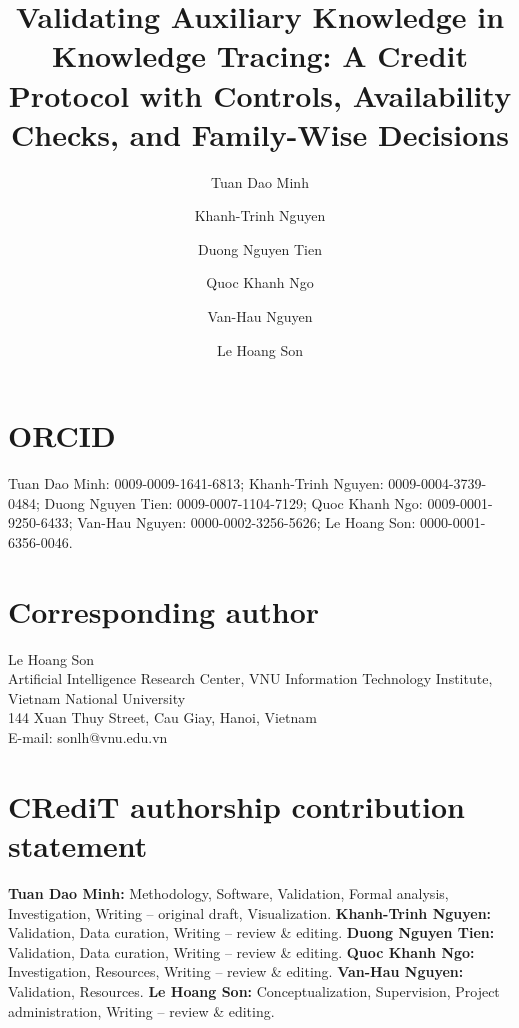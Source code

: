 \documentclass[preprint,12pt]{elsarticle}
\begin{document}
\begin{frontmatter}
\title{Validating Auxiliary Knowledge in Knowledge Tracing: A Credit
Protocol with Controls, Availability Checks, and Family-Wise
Decisions}

\author[utehy]{Tuan Dao Minh}

\author[utehy]{Khanh-Trinh Nguyen}

\author[utehy]{Duong Nguyen Tien}

\author[vnu]{Quoc Khanh Ngo}

\author[utehy]{Van-Hau Nguyen}

\author[vnu]{Le Hoang Son}


\end{frontmatter}

\section*{ORCID}
\raggedright
Tuan Dao Minh: 0009-0009-1641-6813;
Khanh-Trinh Nguyen: 0009-0004-3739-0484;
Duong Nguyen Tien: 0009-0007-1104-7129;
Quoc Khanh Ngo: 0009-0001-9250-6433;
Van-Hau Nguyen: 0000-0002-3256-5626;
Le Hoang Son: 0000-0001-6356-0046.

\section*{Corresponding author}
Le Hoang Son\\
Artificial Intelligence Research Center,
VNU Information Technology Institute,
Vietnam National University\\
144 Xuan Thuy Street, Cau Giay, Hanoi, Vietnam\\
E-mail: sonlh@vnu.edu.vn

\section*{CRediT authorship contribution statement}
\textbf{Tuan Dao Minh:} Methodology, Software, Validation, Formal analysis,
Investigation, Writing -- original draft, Visualization.
\textbf{Khanh-Trinh Nguyen:} Validation, Data curation, Writing -- review \&
editing.
\textbf{Duong Nguyen Tien:} Validation, Data curation, Writing -- review \&
editing.
\textbf{Quoc Khanh Ngo:} Investigation, Resources, Writing -- review \&
editing.
\textbf{Van-Hau Nguyen:} Validation, Resources.
\textbf{Le Hoang Son:} Conceptualization, Supervision, Project
administration, Writing -- review \& editing.
\end{document}
